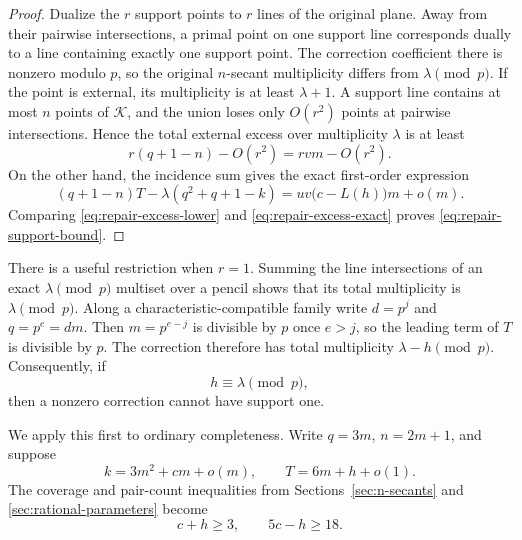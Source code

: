 \begin{proof}
Dualize the \(r\) support points to \(r\) lines of the original plane.
Away from their pairwise intersections, a primal point on one support line
corresponds dually to a line containing exactly one support point.  The
correction coefficient there is nonzero modulo \(p\), so the original
\(n\)-secant multiplicity differs from \(\lambda\pmod p\).  If the point is
external, its multiplicity is at least \(\lambda+1\).  A support line contains
at most \(n\) points of \(\mathcal K\), and the union loses only
\(O(r^2)\) points at pairwise intersections.  Hence the total external excess
over multiplicity \(\lambda\) is at least
\begin{equation}\label{eq:repair-excess-lower}
 r(q+1-n)-O(r^2)=rvm-O(r^2).
\end{equation}
On the other hand, the incidence sum gives the exact first-order expression
\begin{equation}\label{eq:repair-excess-exact}
 (q+1-n)T-\lambda(q^2+q+1-k)
 =uv\bigl(c-L(h)\bigr)m+o(m).
\end{equation}
Comparing \eqref{eq:repair-excess-lower} and
\eqref{eq:repair-excess-exact} proves \eqref{eq:repair-support-bound}.
\end{proof}

There is a useful restriction when \(r=1\).  Summing the line intersections
of an exact \(\lambda\pmod p\) multiset over a pencil shows that its total
multiplicity is \(\lambda\pmod p\).  Along a characteristic-compatible
family write \(d=p^j\) and \(q=p^e=dm\).  Then \(m=p^{e-j}\) is divisible
by \(p\) once \(e>j\), so the leading term of \(T\) is divisible by \(p\).
The correction therefore has total multiplicity
\(\lambda-h\pmod p\).  Consequently, if
\begin{equation}\label{eq:support-one-obstruction}
 h\equiv\lambda\pmod p,
\end{equation}
then a nonzero correction cannot have support one.

We apply this first to ordinary completeness.  Write \(q=3m\),
\(n=2m+1\), and suppose
\begin{equation}\label{eq:characteristic-three-asymptotic}
 k=3m^2+cm+o(m),\qquad T=6m+h+o(1).
\end{equation}
The coverage and pair-count inequalities from Sections~\ref{sec:n-secants}
and \ref{sec:rational-parameters} become
\begin{equation}\label{eq:characteristic-three-linear-bounds}
 c+h\ge3,\qquad 5c-h\ge18.
\end{equation}

